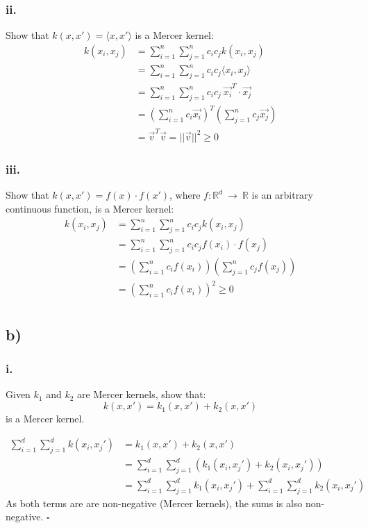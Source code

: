 \documentclass{article}
\begin{document}
\subsubsection*{ii.}
Show that
$k(x,x') = \langle x,x' \rangle$ is a Mercer kernel:\\
\begin{align}
k(x_i,x_j) &=\sum_{i=1}^n \sum_{j=1}^n c_i c_j k(x_i,x_j) \\
&= \sum_{i=1}^n \sum_{j=1}^n c_i c_j \langle x_i,x_j \rangle \\
&= \sum_{i=1}^n \sum_{j=1}^n c_i c_j \  \vec{x_i}^T \cdot \vec{x_j}  \\
&= (\sum_{i=1}^n c_i \vec{x_i})^T (\sum_{j=1}^n c_j \vec{x_j})  \\
&= \vec{v}^T \vec{v} = || \vec{v} ||^2 \geq 0
\end{align}

\subsubsection*{iii.}
Show that $
k(x,x') = f(x)\cdot f(x')$, where $f:\mathbb{R}^d~\rightarrow~\mathbb{R}$ is an arbitrary continuous function, is a Mercer kernel:\\
\begin{align}
k(x_i,x_j) &=\sum_{i=1}^n \sum_{j=1}^n c_i c_j k(x_i,x_j) \\
&= \sum_{i=1}^n \sum_{j=1}^n c_i c_j f(x_i) \cdot f(x_j) \\
&= (\sum_{i=1}^n c_i f(x_i))(\sum_{j=1}^n c_j f(x_j)) \\
&= (\sum_{i=1}^n c_i f(x_i))^2 \geq 0 \\
\end{align}


\subsection*{b)}

\subsubsection*{i.}
Given $k_1$ and $k_2$ are Mercer kernels, show that:
\begin{equation}
    k(x, x') = k_1(x, x') + k_2(x, x')
\end{equation}
is a Mercer kernel.

\begin{align}
    \sum_{i=1}^d \sum_{j=1}^d k(x_i, x_j') &= k_1(x, x') + k_2(x, x') \\
    &= \sum_{i=1}^d \sum_{j=1}^d (k_1(x_i, x_j') + k_2(x_i, x_j'))\\
    &= \sum_{i=1}^d \sum_{j=1}^d k_1(x_i, x_j') + \sum_{i=1}^d \sum_{j=1}^d  k_2(x_i, x_j')
\end{align}
As both terms are are non-negative (Mercer kernels), the sums is also non-negative.
\hfill $\square$
\end{document}
